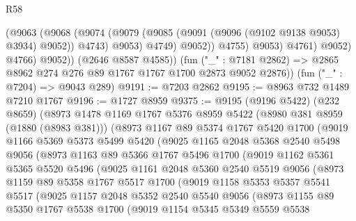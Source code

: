 \begin{lexlean}{R58}
\begin{coremodule}
                        (@9063
                          (@9068
                            (@9074
                              (@9079 (@9085 (@9091 (@9096 (@9102 @9138 @9053) @3934) @9052)) @4743)
                              @9053)
                            @4749)
                          @9052))
                      @4755)
                    @9053)
                  @4761)
                @9052)
              @4766)
            @9052))
        (@2646 @8587 @4585))
      (fun ("_" : @7181 @2862) => @2865 @8962 @274 @276 @89 @1767 @1767 @1700 @2873 @9052 @2876))
    (fun ("_" : @7204) => @9043 @289)
@9191 := @7203 @2862
@9195 := @8963 @732 @1489 @7210 @1767
@9196 := @1727 @8959
@9375 := @9195
    (@9196 @5422)
    (@232 @8659)
    (@8973
      @1478
      @1169
      @1767
      @5376
      @8959
      @5422
      (@8980 @381 @8959 (@1880 (@8983 @381)))
      (@8973
        @1167
        @89
        @5374
        @1767
        @5420
        @1700
        (@9019
          @1166
          @5369
          @5373
          @5499
          @5420
          (@9025
            @1165
            @2048
            @5368
            @2540
            @5498
            @9056
            (@8973
              @1163
              @89
              @5366
              @1767
              @5496
              @1700
              (@9019
                @1162
                @5361
                @5365
                @5520
                @5496
                (@9025
                  @1161
                  @2048
                  @5360
                  @2540
                  @5519
                  @9056
                  (@8973
                    @1159
                    @89
                    @5358
                    @1767
                    @5517
                    @1700
                    (@9019
                      @1158
                      @5353
                      @5357
                      @5541
                      @5517
                      (@9025
                        @1157
                        @2048
                        @5352
                        @2540
                        @5540
                        @9056
                        (@8973
                          @1155
                          @89
                          @5350
                          @1767
                          @5538
                          @1700
                          (@9019
                            @1154
                            @5345
                            @5349
                            @5559
                            @5538

\end{coremodule}
\end{lexlean}
